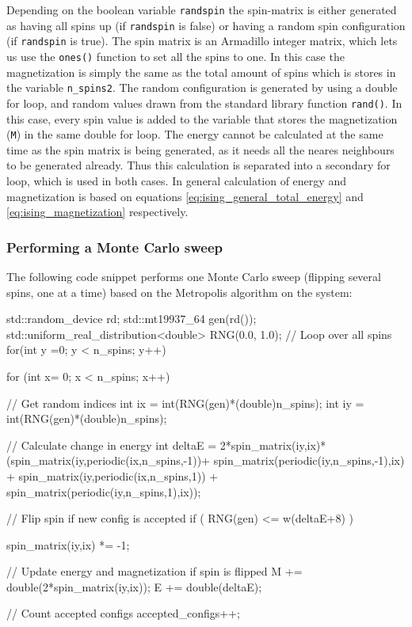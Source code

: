 \documentclass[reprint,english,notitlepage]{revtex4-1}  %
\begin{document}
Depending on the boolean variable \verb+randspin+ the spin-matrix is either generated as having all spins up (if \verb+randspin+ is false) or having a random spin configuration (if \verb+randspin+ is true). The spin matrix is an Armadillo \citep{Armadillo} integer matrix, which lets us use the \verb+ones()+ function to set all the spins to one. In this case the magnetization is simply the same as the total amount of spins which is stores in the variable \verb+n_spins2+. The random configuration is generated by using a double for loop, and random values drawn from the standard library function \verb+rand()+. In this case, every spin value is added to the variable that stores the magnetization (\verb+M+) in the same double for loop. The energy cannot be calculated at the same time as the spin matrix is being generated, as it needs all the neares neighbours to be generated already. Thus this calculation is separated into a secondary for loop, which is used in both cases. In general calculation of energy and magnetization is based on equations  \eqref{eq:ising_general_total_energy} and \eqref{eq:ising_magnetization} respectively.


\subsubsection{Performing a Monte Carlo sweep} \label{sec:III:a:ii}

The following code snippet performs one Monte Carlo sweep (flipping several spins, one at a time) based on the Metropolis algorithm on the system:

\begin{cpp}
std::random_device rd;
std::mt19937_64 gen(rd());
std::uniform_real_distribution<double> RNG(0.0, 1.0);
// Loop over all spins
for(int y =0; y < n_spins; y++) {
  for (int x= 0; x < n_spins; x++){

    // Get random indices
    int ix = int(RNG(gen)*(double)n_spins);
    int iy = int(RNG(gen)*(double)n_spins);

    // Calculate change in energy
    int deltaE =  2*spin_matrix(iy,ix)*
                  (spin_matrix(iy,periodic(ix,n_spins,-1))+
                  spin_matrix(periodic(iy,n_spins,-1),ix) +
                  spin_matrix(iy,periodic(ix,n_spins,1)) +
                  spin_matrix(periodic(iy,n_spins,1),ix));


    // Flip spin if new config is accepted
    if ( RNG(gen) <= w(deltaE+8) ) {
      spin_matrix(iy,ix) *= -1;


      // Update energy and magnetization if spin is flipped
      M += double(2*spin_matrix(iy,ix));
      E += double(deltaE);

      // Count accepted configs
      accepted_configs++;
    }
  }
}
\end{cpp}
\end{document}
